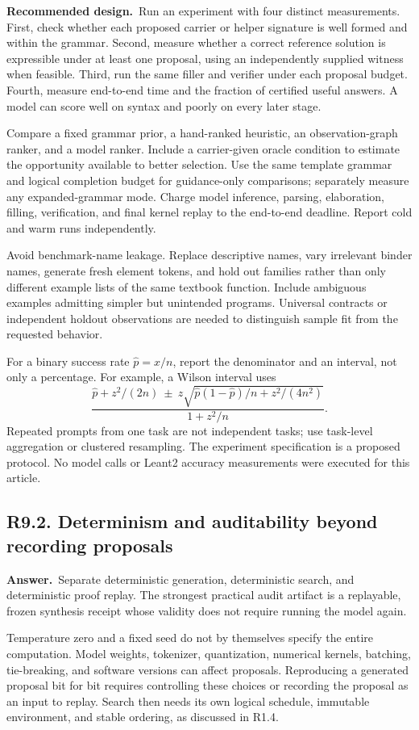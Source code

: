 \documentclass[11pt,a4paper]{article}
\newcommand{\qid}[3]{\subsection{#2. #3}\label{#1}}
\newcommand{\answer}{\noindent\textbf{Answer.}\ }
\newcommand{\proposal}{\noindent\textbf{Recommended design.}\ }
\theoremstyle{remark}
\begin{document}
\proposal Run an experiment with four distinct measurements. First, check whether each proposed carrier or helper signature is well formed and within the grammar. Second, measure whether a correct reference solution is expressible under at least one proposal, using an independently supplied witness when feasible. Third, run the same filler and verifier under each proposal budget. Fourth, measure end-to-end time and the fraction of certified useful answers. A model can score well on syntax and poorly on every later stage.

Compare a fixed grammar prior, a hand-ranked heuristic, an observation-graph ranker, and a model ranker. Include a carrier-given oracle condition to estimate the opportunity available to better selection. Use the same template grammar and logical completion budget for guidance-only comparisons; separately measure any expanded-grammar mode. Charge model inference, parsing, elaboration, filling, verification, and final kernel replay to the end-to-end deadline. Report cold and warm runs independently.

Avoid benchmark-name leakage. Replace descriptive names, vary irrelevant binder names, generate fresh element tokens, and hold out families rather than only different example lists of the same textbook function. Include ambiguous examples admitting simpler but unintended programs. Universal contracts or independent holdout observations are needed to distinguish sample fit from the requested behavior.

For a binary success rate $\hat p=x/n$, report the denominator and an interval, not only a percentage. For example, a Wilson interval uses
\[
 \frac{\hat p+z^2/(2n)\ \pm\
 z\sqrt{\hat p(1-\hat p)/n+z^2/(4n^2)}}{1+z^2/n}.
\]
Repeated prompts from one task are not independent tasks; use task-level aggregation or clustered resampling. The experiment specification is a proposed protocol. No model calls or Leant2 accuracy measurements were executed for this article.

\qid{q92}{R9.2}{Determinism and auditability beyond recording proposals}
\answer Separate deterministic generation, deterministic search, and deterministic proof replay. The strongest practical audit artifact is a replayable, frozen synthesis receipt whose validity does not require running the model again.

Temperature zero and a fixed seed do not by themselves specify the entire computation. Model weights, tokenizer, quantization, numerical kernels, batching, tie-breaking, and software versions can affect proposals. Reproducing a generated proposal bit for bit requires controlling these choices or recording the proposal as an input to replay. Search then needs its own logical schedule, immutable environment, and stable ordering, as discussed in R1.4.
\end{document}
